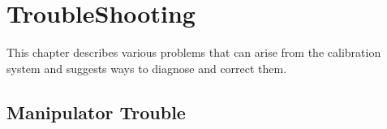 
  
\chapter{TroubleShooting}
  

    This chapter describes various problems that can arise from
the calibration system and suggests ways to diagnose and correct
them.

\newpage
\section{Manipulator Trouble}
  
